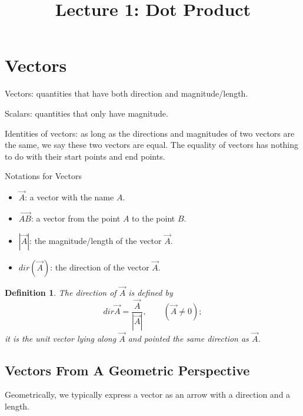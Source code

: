 \documentclass{article}
\title{Lecture 1: Dot Product}
\author{}
\date{}
\newtheorem*{definition}{Definition}
\begin{document}
\maketitle

\section{Vectors}

Vectors: quantities that have both direction and magnitude/length.

Scalars: quantities that only have magnitude.

Identities of vectors: as long as the directions and magnitudes of two vectors 
are the same, we say these two vectors are equal. The equality of vectors has 
nothing to do with their start points and end points.

\bigskip

Notations for Vectors
\begin{itemize}
	\item $\vec{A}$: a vector with the name $A$.
	\item $\vec{AB}$: a vector from the point $A$ to the point $B$.
	\item $|\vec{A}|$: the magnitude/length of the vector $\vec{A}$.
	\item $dir(\vec{A})$: the direction of the vector $\vec{A}$.
\end{itemize}

\begin{definition}
	The direction of $\vec{A}$ is defined by 
	\[ dir \vec{A} = \frac{\vec{A}}{|\vec{A}|}, \qquad (\vec{A} \neq 0); \]
	it is the unit vector lying along $\vec{A}$ and pointed the same direction as
	$\vec{A}$.
\end{definition}

\subsection{Vectors From A Geometric Perspective}

Geometrically, we typically express a vector as an arrow with a direction and 
a length.

\smallskip
\end{document}
